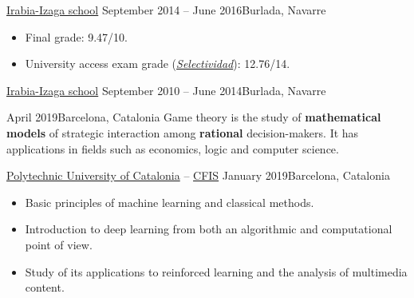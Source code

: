 \documentclass[10pt, a4paper, ragged2e]{altacv}
\begin{document}
\divider

{\href{https://www.irabia-izaga.org}{Irabia-Izaga school}}
{September 2014 -- June 2016}{Burlada, Navarre}
\begin{itemize}
  \item Final grade: 9.47/10.
  \item University access exam grade
  (\href{https://en.wikipedia.org/wiki/Selectividad}{\textit{Selectividad}}):
  12.76/14.
\end{itemize}

\divider

{\href{https://www.irabia-izaga.org}{Irabia-Izaga school}}
{September 2010 -- June 2014}{Burlada, Navarre}

\medskip
{}

{April 2019}{Barcelona, Catalonia}
Game theory is the study of \textbf{mathematical models} of strategic
interaction among \textbf{rational} decision-makers. It has applications in
fields such as economics, logic and computer science.

\vspace{.1cm}
\divider
\vspace{.15cm}

{\href{https://www.upc.edu/en}{Polytechnic University of Catalonia} --
  \href{https://cfis.upc.edu}{CFIS}}
{January 2019}{Barcelona, Catalonia}
\begin{itemize}
  \item Basic principles of machine learning and classical methods.
  \item Introduction to deep learning from both an algorithmic and computational
  point of view.
  \item Study of its applications to reinforced learning and the analysis of
  multimedia content.
\end{itemize}


\clearpage

\end{document}
